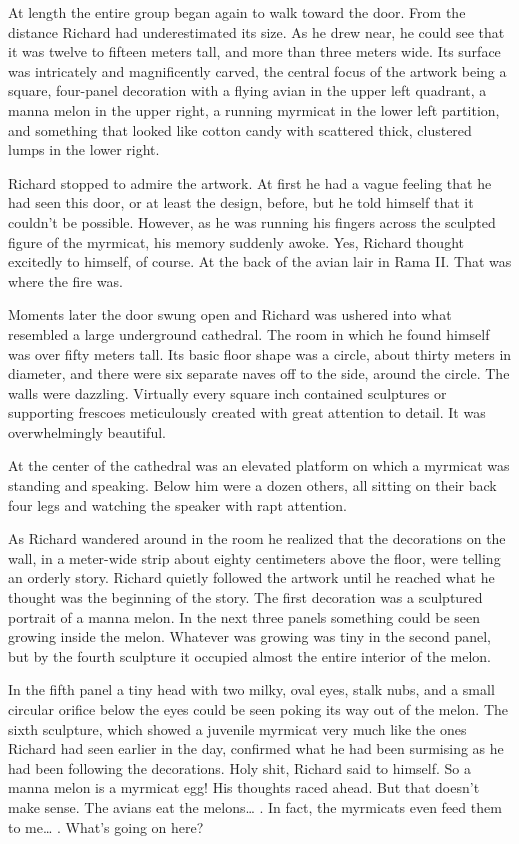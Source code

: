 \documentclass[]{article}
\begin{document}
{{At length the entire group began again to walk toward the door.  From the distance Richard had underestimated its size.  As he drew near, he could see that it was twelve to fifteen meters tall, and more than three meters wide.  Its surface was intricately and magnificently carved, the central focus of the artwork being a square, four-panel decoration with a flying avian in the upper left quadrant, a manna melon in the upper right, a running myrmicat in the lower left partition, and something that looked like cotton candy with scattered thick, clustered lumps in the lower right.

Richard stopped to admire the artwork.  At first he had a vague feeling that he had seen this door, or at least the design, before, but he told himself that it couldn’t be possible.  However, as he was running his fingers across the sculpted figure of the myrmicat, his memory suddenly awoke.  Yes, Richard thought excitedly to himself, of course.  At the back of the avian lair in Rama II.  That was where the fire was.

Moments later the door swung open and Richard was ushered into what resembled a large underground cathedral.  The room in which he found himself was over fifty meters tall.  Its basic floor shape was a circle, about thirty meters in diameter, and there were six separate naves off to the side, around the circle.  The walls were dazzling.  Virtually every square inch contained sculptures or supporting frescoes meticulously created with great attention to detail.  It was overwhelmingly beautiful.

At the center of the cathedral was an elevated platform on which a myrmicat was standing and speaking.  Below him were a dozen others, all sitting on their back four legs and watching the speaker with rapt attention.

As Richard wandered around in the room he realized that the decorations on the wall, in a meter-wide strip about eighty centimeters above the floor, were telling an orderly story.  Richard quietly followed the artwork until he reached what he thought was the beginning of the story.  The first decoration was a sculptured portrait of a manna melon.  In the next three panels something could be seen growing inside the melon.  Whatever was growing was tiny in the second panel, but by the fourth sculpture it occupied almost the entire interior of the melon.

In the fifth panel a tiny head with two milky, oval eyes, stalk nubs, and a small circular orifice below the eyes could be seen poking its way out of the melon.  The sixth sculpture, which showed a juvenile myrmicat very much like the ones Richard had seen earlier in the day, confirmed what he had been surmising as he had been following the decorations.  Holy shit, Richard said to himself.  So a manna melon is a myrmicat egg! His thoughts raced ahead.  But that doesn’t make sense.  The avians eat the melons… .  In fact, the myrmicats even feed them to me… .  What’s going on here?

}}
\end{document}
